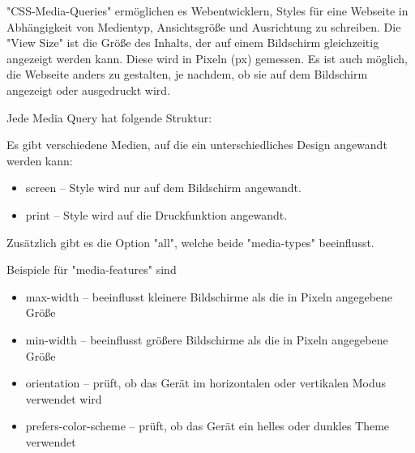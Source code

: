 \label{sec:mediaQueries}

"CSS-Media-Queries" ermöglichen es Webentwicklern, Styles für eine Webseite in Abhängigkeit von Medientyp, Ansichtsgröße und Ausrichtung zu schreiben. 
Die "View Size" ist die Größe des Inhalts, der auf einem Bildschirm gleichzeitig angezeigt werden kann.
Diese wird in Pixeln ({\ttfamily px}) gemessen. 
Es ist auch möglich, die Webseite anders zu gestalten, je nachdem, ob sie auf dem Bildschirm angezeigt oder ausgedruckt wird. 

\begin{minipage}{\textwidth}
    Jede Media Query hat folgende Struktur:
    
\end{minipage}

Es gibt verschiedene Medien, auf die ein unterschiedliches Design angewandt werden kann: 
\begin{itemize}
    \item screen -- Style wird nur auf dem Bildschirm angewandt.
    \item print -- Style wird auf die Druckfunktion angewandt.
\end{itemize}

Zusätzlich gibt es die Option "all", welche beide "media-types" beeinflusst. \cite{w3MediaQueries}

Beispiele für "media-features" sind

\begin{itemize}
    \item max-width -- beeinflusst kleinere Bildschirme als die in Pixeln angegebene Größe
    \item min-width -- beeinflusst größere Bildschirme als die in Pixeln angegebene Größe
    \item orientation -- prüft, ob das Gerät im horizontalen oder vertikalen Modus verwendet wird
    \item prefers-color-scheme -- prüft, ob das Gerät ein helles oder dunkles Theme verwendet
\end{itemize}
